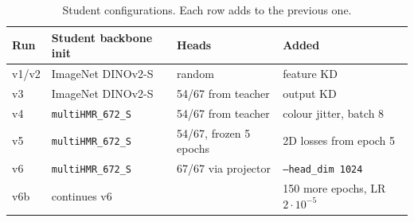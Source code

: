 
\begin{table}[h]
\centering\small
\begin{tabular}{llll}
\toprule
Run & Student backbone init & Heads & Added \\
\midrule
v1/v2 & ImageNet DINOv2-S & random & feature KD \\
v3 & ImageNet DINOv2-S & 54/67 from teacher & output KD \\
v4 & \texttt{multiHMR\_672\_S} & 54/67 from teacher & colour jitter, batch 8 \\
v5 & \texttt{multiHMR\_672\_S} & 54/67, frozen 5 epochs & 2D losses from epoch 5 \\
v6 & \texttt{multiHMR\_672\_S} & 67/67 via projector & \texttt{--head\_dim 1024} \\
v6b & continues v6 & & 150 more epochs, LR $2{\cdot}10^{-5}$ \\
\bottomrule
\end{tabular}
\caption{Student configurations. Each row adds to the previous one.}
\label{tab:student_runs}
\end{table}
